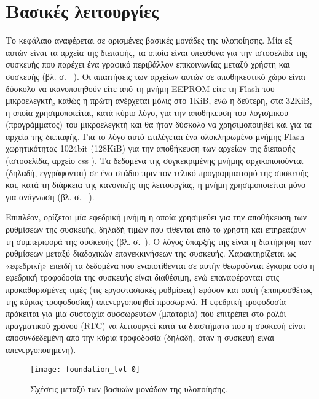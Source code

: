 \chapter{Βασικές λειτουργίες}
\label{ch:foundation}

Το κεφάλαιο αναφέρεται σε ορισμένες βασικές μονάδες της υλοποίησης.
Μία εξ αυτών είναι τα αρχεία της διεπαφής, τα οποία είναι υπεύθυνα για την
ιστοσελίδα της συσκευής που παρέχει ένα γραφικό περιβάλλον επικοινωνίας μεταξύ
χρήστη και συσκευής (βλ.  σ.~%
\pageref{subsec:network:files}).
Οι απαιτήσεις των αρχείων αυτών σε αποθηκευτικό χώρο είναι δύσκολο να
ικανοποιηθούν είτε από τη μνήμη EEPROM είτε τη Flash του μικροελεγκτή, καθώς η
πρώτη ανέρχεται μόλις στο 1KiB, ενώ η δεύτερη, στα 32KiB, η οποία
χρησιμοποιείται, κατά κύριο λόγο, για την αποθήκευση του λογισμικού
(προγράμματος) του μικροελεγκτή και θα ήταν δύσκολο να χρησιμοποιηθεί και για
τα αρχεία της διεπαφής.
Για το λόγο αυτό επιλέγεται ένα ολοκληρωμένο μνήμης Flash χωρητικότητας 1024bit
(128KiB) για την αποθήκευση των αρχείων της διεπαφής (ιστοσελίδα, αρχείο
css ). Τα δεδομένα της συγκεκριμένης μνήμης αρχικοποιούνται (δηλαδή,
εγγράφονται) σε ένα στάδιο πριν τον τελικό προγραμματισμό της συσκευής και, κατά
τη διάρκεια της κανονικής της λειτουργίας, η μνήμη χρησιμοποιείται μόνο για
ανάγνωση (βλ.  σ.~%
\pageref{subsec:external-memory}).

Επιπλέον, ορίζεται μία εφεδρική μνήμη η οποία χρησιμεύει για την αποθήκευση των
ρυθμίσεων της συσκευής, δηλαδή τιμών που τίθενται από το χρήστη και επηρεάζουν
τη συμπεριφορά της συσκευής (βλ. σ.~\pageref{subsec:backup-memory}). Ο λόγος
ύπαρξής της είναι η διατήρηση των ρυθμίσεων μεταξύ διαδοχικών επανεκκινήσεων της
συσκευής. Χαρακτηρίζεται ως «εφεδρική» επειδή τα δεδομένα που εναποτίθενται σε
αυτήν θεωρούνται έγκυρα όσο η εφεδρική τροφοδοσία της συσκευής είναι διαθέσιμη,
ενώ επαναφέρονται στις προκαθορισμένες τιμές (τις εργοστασιακές ρυθμίσεις)
εφόσον και αυτή (επιπροσθέτως της κύριας τροφοδοσίας) απενεργοποιηθεί προσωρινά.
Η εφεδρική τροφοδοσία πρόκειται για μία συστοιχία συσσωρευτών (μπαταρία) που
επιτρέπει στο ρολόι πραγματικού χρόνου (RTC) να λειτουργεί κατά τα διαστήματα
που η συσκευή είναι αποσυνδεδεμένη από την κύρια τροφοδοσία (δηλαδή, όταν η
συσκευή είναι απενεργοποιημένη).
\begin{figure}
    \caption{Σχέσεις μεταξύ των βασικών μονάδων της υλοποίησης.
    \label{fig:foundation:lvl-0}}
    \begin{center}
    \texttt{[image: foundation\_lvl-0]}
    \end{center}
\end{figure}

